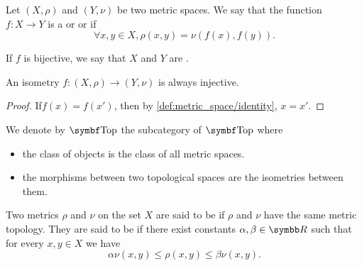 \begin{definition}\label{def:isometry}\cite[253]{Engelking1989}
  Let \( (X, \rho) \) and \( (Y, \nu) \) be two metric spaces. We say that the function \( f: X \to Y \) is a  or  or  if
  \begin{equation*}
    \forall x, y \in X, \rho(x, y) = \nu(f(x), f(y)).
  \end{equation*}

  If \( f \) is bijective, we say that \( X \) and \( Y \) are .
\end{definition}

\begin{proposition}\label{def:isometry_is_injective}
  An isometry \( f: (X, \rho) \to (Y, \nu) \) is always injective.
\end{proposition}
\begin{proof}
  If\LEM \( f(x) = f(x') \), then by \ref{def:metric_space/identity}, \( x = x' \).
\end{proof}

\begin{definition}\label{def:category_of_metric_spaces}
  We denote by \( \Cat{Top} \) the subcategory of \( \Bold{Top} \) where
  \begin{itemize}
    \item the class of objects is the class of all metric spaces.
    \item the morphisms between two topological spaces are the isometries between them.
  \end{itemize}
\end{definition}

\begin{definition}\label{def:equivalent_metrics}
  Two metrics \( \rho \) and \( \nu \) on the set \( X \) are said to be  if \( \rho \) and \( \nu \) have the same metric topology. They are said to be  if there exist constants \( \alpha, \beta \in \BR \) such that for every \( x, y \in X \) we have
  \begin{equation*}
    \alpha \nu(x, y) \leq \rho(x, y) \leq \beta \nu(x, y).
  \end{equation*}
\end{definition}

